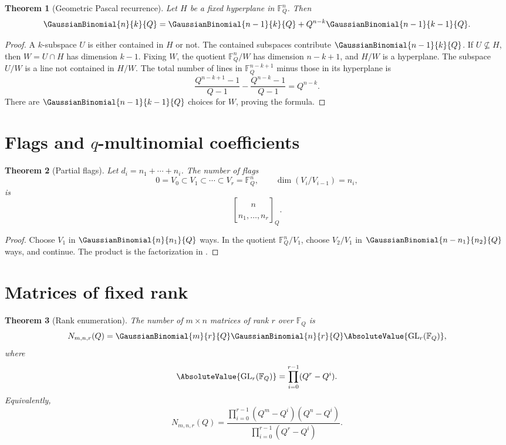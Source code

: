 \documentclass[11pt,a4paper,oneside,openany]{book}
\newtheorem{theorem}{Theorem}[chapter]
\theoremstyle{definition}
\theoremstyle{remark}
\newcommand{\F}{\mathbb F}
\begin{document}
\begin{theorem}[Geometric Pascal recurrence]\label{thm:geometric-pascal}
Let $H$ be a fixed hyperplane in $\F_Q^n$.  Then
\[
 \GaussianBinomial{n}{k}{Q}
 =\GaussianBinomial{n-1}{k}{Q}+Q^{n-k}\GaussianBinomial{n-1}{k-1}{Q}.
\]
\end{theorem}

\begin{proof}
A $k$-subspace $U$ is either contained in $H$ or not.  The contained subspaces contribute $\GaussianBinomial{n-1}{k}{Q}$.  If $U\not\subseteq H$, then $W=U\cap H$ has dimension $k-1$.  Fixing $W$, the quotient $\F_Q^n/W$ has dimension $n-k+1$, and $H/W$ is a hyperplane.  The subspace $U/W$ is a line not contained in $H/W$.  The total number of lines in $\F_Q^{n-k+1}$ minus those in its hyperplane is
\[
 \frac{Q^{n-k+1}-1}{Q-1}-\frac{Q^{n-k}-1}{Q-1}=Q^{n-k}.
\]
There are $\GaussianBinomial{n-1}{k-1}{Q}$ choices for $W$, proving the formula.
\end{proof}

\section{Flags and \texorpdfstring{$q$}{q}-multinomial coefficients}

\begin{theorem}[Partial flags]\label{thm:flag-count}
Let $d_i=n_1+\cdots+n_i$.  The number of flags
\[
 0=V_0\subset V_1\subset\cdots\subset V_r=\F_Q^n,
 \qquad \dim(V_i/V_{i-1})=n_i,
\]
is
\[
 \genfrac{[}{]}{0pt}{}{n}{n_1,\dots,n_r}_{Q}.
\]
\end{theorem}

\begin{proof}
Choose $V_1$ in $\GaussianBinomial{n}{n_1}{Q}$ ways.  In the quotient $\F_Q^n/V_1$, choose $V_2/V_1$ in $\GaussianBinomial{n-n_1}{n_2}{Q}$ ways, and continue.  The product is the factorization in .
\end{proof}

\section{Matrices of fixed rank}

\begin{theorem}[Rank enumeration]\label{thm:rank-matrices}
The number of $m\times n$ matrices of rank $r$ over $\F_Q$ is
\[
 N_{m,n,r}(Q)
 =\GaussianBinomial{m}{r}{Q}\GaussianBinomial{n}{r}{Q}\AbsoluteValue{\mathrm{GL}_r(\F_Q)},
\]
where
\[
 \AbsoluteValue{\mathrm{GL}_r(\F_Q)}=\prod_{i=0}^{r-1}(Q^r-Q^i).
\]
Equivalently,
\[
 N_{m,n,r}(Q)
 =\frac{\prod_{i=0}^{r-1}(Q^m-Q^i)(Q^n-Q^i)}
 {\prod_{i=0}^{r-1}(Q^r-Q^i)}.
\]
\end{theorem}
\end{document}
